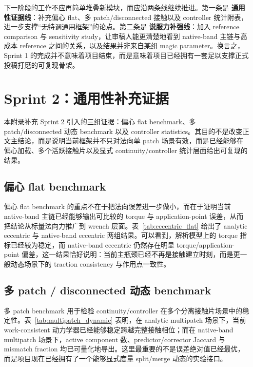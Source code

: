 \documentclass[11pt,a4paper]{ctexart}
\begin{document}
下一阶段的工作不应再简单堆叠新模块，而应沿两条线继续推进。第一条是 \textbf{通用性证据线}：补充偏心 flat、多 patch/disconnected 接触以及 controller 统计附表，进一步支撑“无特调通用框架”的论点。第二条是 \textbf{说服力补强线}：加入 reference comparison 与 sensitivity study，让审稿人能更清楚地看到 native-band 主链与高成本 reference 之间的关系，以及结果并非来自某组 magic parameter。换言之，Sprint 1 的完成并不意味着项目结束，而是意味着项目已经拥有一套足以支撑正式投稿打磨的可复现骨架。


\FloatBarrier
\clearpage
\appendix
\section{Sprint 2：通用性补充证据}
本附录补充 Sprint 2 引入的三组证据：偏心 flat benchmark、多 patch/disconnected 动态 benchmark 以及 controller statistics。其目的不是改变正文主结论，而是说明当前框架并不只对法向单 patch 场景有效，而是已经能够在偏心加载、多个活跃接触片以及显式 continuity/controller 统计层面给出可复现的结果。

\subsection{偏心 flat benchmark}
偏心 flat benchmark 的重点不在于把法向误差进一步做小，而在于证明当前 native-band 主链已经能够输出可比较的 torque 与 application-point 误差，从而把结论从标量法向力推广到 wrench 层面。表~\ref{tab:eccentric_flat} 给出了 analytic eccentric 与 native-band eccentric 两组结果。可以看到，解析模型上的 torque 指标已经较为稳定，而 native-band eccentric 仍然存在明显 torque/application-point 偏差，这一结果恰好说明：当前主瓶颈已经不再是接触建立时刻，而是更一般动态场景下的 traction consistency 与作用点一致性。



\subsection{多 patch / disconnected 动态 benchmark}
多 patch benchmark 用于检验 continuity/controller 在多个分离接触片场景中的稳定性。表~\ref{tab:multipatch_dynamic} 表明，在 analytic multipatch 场景下，当前 work-consistent 动力学器已经能够稳定跨越完整接触相位；而在 native-band multipatch 场景下，active component 数、predictor/corrector Jaccard 与 mismatch fraction 均已可量化地导出。这里最重要的不是误差绝对值已经最优，而是项目现在已经拥有了一个能够显式度量 split/merge 动态的实验接口。


\end{document}
